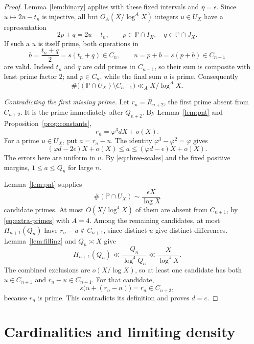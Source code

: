 \documentclass[11pt,letterpaper]{article}
\numberwithin{equation}{section}
\theoremstyle{remark}
\newcommand{\Pp}{\mathbb P}
\newcommand{\ph}{\varphi}
\begin{document}
\begin{proof}
Lemma~\ref{lem:binary} applies with these fixed intervals and
$\eta=\epsilon$. Since $u\mapsto2u-t_n$ is injective, all but
$O_A(X/\log^A X)$ integers $u\in U_X$ have a representation
\begin{equation}\label{eq:bridge}
 2p+q=2u-t_n,\qquad p\in\Pp\cap I_X,\quad q\in\Pp\cap J_X.
\end{equation}
If such a $u$ is itself prime, both operations in
\begin{equation}\label{eq:two-operations}
 b=\frac{t_n+q}{2}=s(t_n+q)\in C_n,
 \qquad u=p+b=s(p+b)\in C_{n+1}
\end{equation}
are valid. Indeed $t_n$ and $q$ are odd primes in $C_{n-1}$,
so their sum is composite with least prime factor $2$; and
$p\in C_n$, while the final sum $u$ is prime. Consequently
\begin{equation}\label{eq:extra-primes}
 \#\bigl((\Pp\cap U_X)\setminus C_{n+1}\bigr)
 \ll_A X/\log^A X.
\end{equation}

\medskip\noindent\textit{Contradicting the first missing prime.}
Let $r_n=R_{n+2}$, the first prime absent from $C_{n+2}$.
It is the prime immediately after $Q_{n+2}$. By
Lemma~\ref{lem:pnt} and Proposition~\ref{prop:constants},
\begin{equation}\label{eq:first-missing-scale}
 r_n=\ph^3dX+o(X).
\end{equation}
For a prime $u\in U_X$, put $a=r_n-u$. The identity
$\ph^3-\ph^2=\ph$ gives
\[
 (\ph d-2\epsilon)X+o(X)
 \le a\le(\ph d-\epsilon)X+o(X).
\]
The errors here are uniform in $u$. By \eqref{eq:three-scales}
and the fixed positive margins, $1\le a\le Q_n$ for large $n$.

Lemma~\ref{lem:pnt} supplies
\[
 \#(\Pp\cap U_X)\sim\frac{\epsilon X}{\log X}
\]
candidate primes. At most $O(X/\log^4X)$ of them are absent from
$C_{n+1}$, by \eqref{eq:extra-primes} with $A=4$. Among the
remaining candidates, at most $H_{n+1}(Q_n)$ have
$r_n-u\notin C_{n+1}$, since distinct $u$ give distinct differences.
Lemma~\ref{lem:filling} and $Q_n\asymp X$ give
\[
 H_{n+1}(Q_n)\ll\frac{Q_n}{\log^4Q_n}
 \ll\frac{X}{\log^4X}.
\]
The combined exclusions are $o(X/\log X)$, so at least one candidate
has both $u\in C_{n+1}$ and $r_n-u\in C_{n+1}$. For that candidate,
\[
 s\bigl(u+(r_n-u)\bigr)=r_n\in C_{n+2},
\]
because $r_n$ is prime. This contradicts its definition and proves
$d=c$.
\end{proof}

\section{Cardinalities and limiting density}
\end{document}

